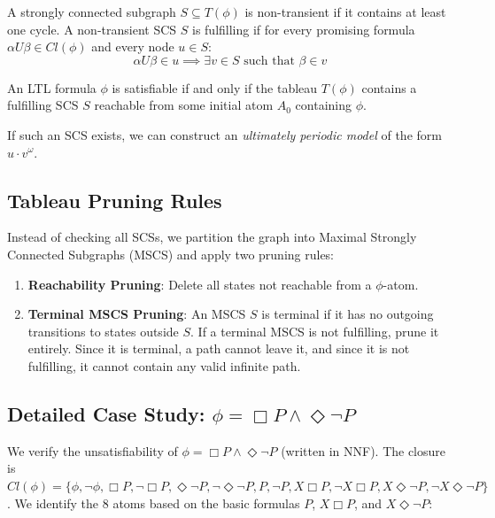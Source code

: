 \begin{definition}
A strongly connected subgraph $S \subseteq T(\phi)$ is non-transient if it contains at least one cycle. A non-transient SCS $S$ is fulfilling if for every promising formula $\alpha U \beta \in Cl(\phi)$ and every node $u \in S$:
\[
  \alpha U \beta \in u \implies \exists v \in S \text{ such that } \beta \in v
\]
\end{definition}

\begin{theorem}
An LTL formula $\phi$ is satisfiable if and only if the tableau $T(\phi)$ contains a fulfilling SCS $S$ reachable from some initial atom $A_0$ containing $\phi$.
\end{theorem}

If such an SCS exists, we can construct an \emph{ultimately periodic model} of the form $u \cdot v^\omega$.

\subsection{Tableau Pruning Rules}
Instead of checking all SCSs, we partition the graph into Maximal Strongly Connected Subgraphs (MSCS) and apply two pruning rules:
\begin{enumerate}
    \item \textbf{Reachability Pruning}: Delete all states not reachable from a $\phi$-atom.
    \item \textbf{Terminal MSCS Pruning}: An MSCS $S$ is terminal if it has no outgoing transitions to states outside $S$. If a terminal MSCS is not fulfilling, prune it entirely. Since it is terminal, a path cannot leave it, and since it is not fulfilling, it cannot contain any valid infinite path.
\end{enumerate}

\subsection{Detailed Case Study: $\phi = \Box P \land \Diamond \neg P$}
We verify the unsatisfiability of $\phi = \Box P \land \Diamond \neg P$ (written in NNF).
The closure is $Cl(\phi) = \{ \phi, \neg\phi, \Box P, \neg\Box P, \Diamond\neg P, \neg\Diamond\neg P, P, \neg P, X\Box P, \neg X\Box P, X\Diamond\neg P, \neg X\Diamond\neg P \}$.
We identify the 8 atoms based on the basic formulas $P$, $X\Box P$, and $X\Diamond\neg P$:

